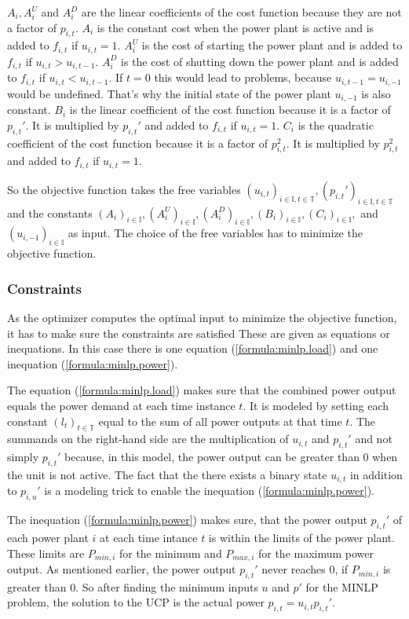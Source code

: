 $A_i, A_i^U$ and $A_i^D$ are the linear coefficients of the cost function because they are not a factor of $p_{i, t}$.
$A_i$ is the constant cost when the power plant is active and is added to $f_{i, t}$ if $u_{i, t} = 1$.
$A_i^U$ is the cost of starting the power plant and is added to $f_{i, t}$ if $u_{i, t} > u_{i, t-1}$.
$A_i^D$ is the cost of shutting down the power plant and is added to $f_{i, t}$ if $u_{i, t} < u_{i, t-1}$.
If $t = 0$ this would lead to problems, because $u_{i, t-1} = u_{i, -1}$ would be undefined.
That's why the initial state of the power plant $u_{i, -1}$ is also constant.
$B_i$ is the linear coefficient of the cost function because it is a factor of $p_{i, t}'$.
It is multiplied by $p_{i, t}'$ and added to $f_{i, t}$ if $u_{i,  t} = 1$.
$C_i$ is the quadratic coefficient of the cost function because it is a factor of $p_{i, t}^2$.
It is multiplied by $p_{i, t}^2$ and added to $f_{i, t}$ if $u_{i,  t} = 1$.

So the objective function takes the free variables
$
(u_{i, t})_{i \in \mathbb{I}, t \in \mathbb{T}},
(p_{i, t}')_{i \in \mathbb{I}, t \in \mathbb{T}}
$ and the constants $
(A_i)_{i \in \mathbb{I}},
(A_i^U)_{i \in \mathbb{I}},
(A_i^D)_{i \in \mathbb{I}},
(B_i)_{i \in \mathbb{I}},
(C_i)_{i \in \mathbb{I}},
$ and $
(u_{i, -1})_{i \in \mathbb{I}}
$ as input.
The choice of the free variables has to minimize the objective function.

\subsubsection{Constraints}

As the optimizer computes the optimal input to minimize the objective function, it has to make sure the constraints are satisfied
These are given as equations or inequations.
In this case there is one equation (\ref{formula:minlp.load}) and one inequation (\ref{formula:minlp.power}).

The equation (\ref{formula:minlp.load}) makes sure that the combined power output equals the power demand at each time instance $t$.
It is modeled by setting each constant $(l_t)_{t \in \mathbb{T}}$ equal to the sum of all power outputs at that time $t$.
The summands on the right-hand side are the multiplication of $u_{i, t}$ and $p_{i, t}'$ and not simply $p_{i, t}'$ because, in this model, the power output can be greater than $0$ when the unit is not active.
The fact that the there exists a binary state $u_{i, t}$ in addition to $p_{i, u}'$ is a modeling trick to enable the inequation (\ref{formula:minlp.power}).

The inequation (\ref{formula:minlp.power}) makes sure, that the power output $p_{i, t}'$ of each power plant $i$ at each time intance $t$ is within the limits of the power plant.
These limits are $P_{min, i}$ for the minimum and $P_{max, i}$ for the maximum power output.
As mentioned earlier, the power output $p_{i, t}'$ never reaches $0$, if $P_{min, i}$ is greater than $0$.
So after finding the minimum inputs $u$ and $p'$ for the MINLP problem,
the solution to the UCP is the actual power $p_{i, t} = u_{i, t} p_{i, t}'$.
